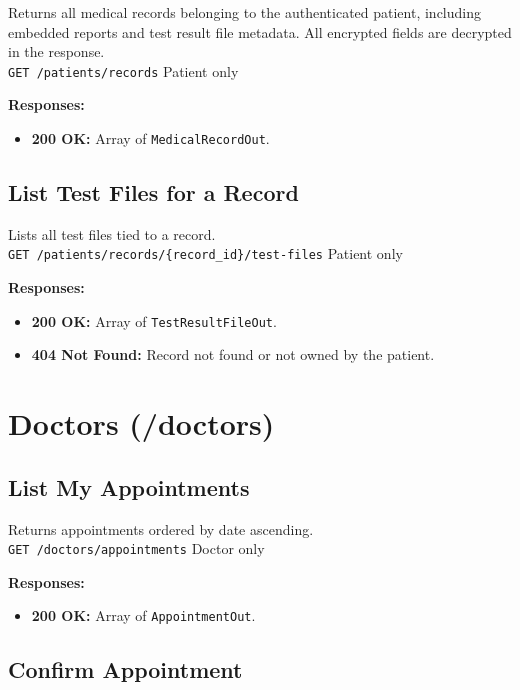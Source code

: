 \documentclass[a4paper,12pt]{report}
\begin{document}
Returns all medical records belonging to the authenticated patient, including embedded reports and test result file metadata. All encrypted fields are decrypted in the response. \\
\texttt{GET /patients/records} \hfill Patient only

\noindent\textbf{Responses:}
\begin{itemize}
    \item \textbf{200 OK:} Array of \texttt{MedicalRecordOut}.
\end{itemize}

\subsection{List Test Files for a Record}

Lists all test files tied to a record. \\
\texttt{GET /patients/records/\{record\_id\}/test-files} \hfill Patient only

\noindent\textbf{Responses:}
\begin{itemize}
    \item \textbf{200 OK:} Array of \texttt{TestResultFileOut}.
    \item \textbf{404 Not Found:} Record not found or not owned by the patient.
\end{itemize}

\section{Doctors (/doctors)}

\subsection{List My Appointments}

Returns appointments ordered by date ascending. \\
\texttt{GET /doctors/appointments} \hfill Doctor only

\noindent\textbf{Responses:}
\begin{itemize}
    \item \textbf{200 OK:} Array of \texttt{AppointmentOut}.
\end{itemize}

\subsection{Confirm Appointment}
\end{document}

